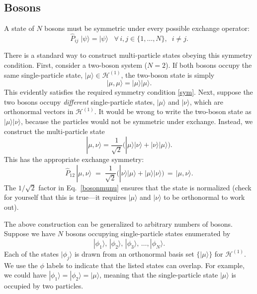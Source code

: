 \documentclass[pra,12pt]{revtex4}
\begin{document}
\subsection{Bosons}
\label{sec:bosons}

A state of $N$ bosons must be symmetric under every possible exchange
operator:
\begin{equation}
  \hat{P}_{ij}\; |\psi\rangle = |\psi\rangle \;\;\; \forall\, i, j \in\{1,\dots,N\},\;\; i\ne j.
  \label{sym}
\end{equation}

There is a standard way to construct multi-particle states obeying
this symmetry condition.  First, consider a two-boson system ($N =
2$).  If both bosons occupy the same single-particle state,
$|\mu\rangle \in \mathscr{H}^{(1)}$, the two-boson state is simply
\begin{equation}
  |\mu,\mu\rangle = |\mu\rangle  |\mu\rangle.
\end{equation}
This evidently satisfies the required symmetry condition \eqref{sym}.
Next, suppose the two bosons occupy \textit{different} single-particle
states, $|\mu\rangle$ and $|\nu\rangle$, which are orthonormal vectors
in $\mathscr{H}^{(1)}$.  It would be wrong to write the two-boson
state as $|\mu\rangle |\nu\rangle$, because the particles would not be
symmetric under exchange.  Instead, we construct the multi-particle
state
\begin{equation}
  |\mu,\nu\rangle = \frac{1}{\sqrt{2}} \Big( |\mu\rangle |\nu\rangle +
  |\nu\rangle |\mu\rangle\Big).
  \label{bosonmunu}
\end{equation}
This has the appropriate exchange symmetry:
\begin{equation}
  \hat{P}_{12}\,|\mu,\nu\rangle \;=\; \frac{1}{\sqrt{2}}
  \Big( |\nu\rangle  |\mu\rangle + |\mu\rangle  |\nu\rangle\Big)
  \,=\, |\mu, \nu\rangle.
\end{equation}
The $1/\sqrt{2}$ factor in Eq.~\eqref{bosonmunu} ensures that the
state is normalized (check for yourself that this is true---it
requires $|\mu\rangle$ and $|\nu\rangle$ to be orthonormal to work
out).

The above construction can be generalized to arbitrary numbers of
bosons.  Suppose we have $N$ bosons occupying single-particle states
enumerated by
\begin{equation}
  |\phi_1\rangle, \, |\phi_2\rangle, \, |\phi_3\rangle, \, \dots, |\phi_N\rangle.
\end{equation}
Each of the states $|\phi_j\rangle$ is drawn from an orthonormal basis
set $\{|\mu\rangle\}$ for $\mathscr{H}^{(1)}$.  We use the $\phi$
labels to indicate that the listed states can overlap.  For example,
we could have $|\phi_1\rangle = |\phi_2\rangle = |\mu\rangle$, meaning
that the single-particle state $|\mu\rangle$ is occupied by two
particles.
\end{document}
